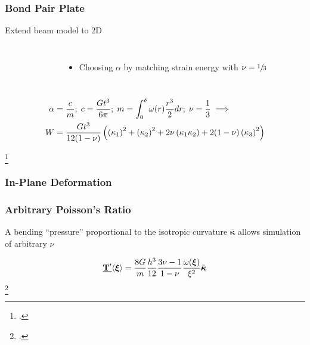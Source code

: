 \begin{frame}
  \frametitle{Bond Pair Plate}

    \begin{center}
        Extend beam model to 2D
    \end{center}

     \begin{columns}[T] %

        \vspace{-1.5cm}
        \begin{figure}
            \centering
        \end{figure}

       \vfill
       \begin{itemize}
           \item Choosing \(\alpha\) by matching strain energy with \(\nu = \sfrac{1}{3}\)
       \end{itemize}
     
     \end{columns}
%
%
\begin{align*}
\alpha &= \frac{c}{m} ;\; c= \frac{G t^3}{6 \pi} ;\; m=\int_{0}^\delta \omega(r)\frac{r^3}{2} dr ;\; \nu=\frac{1}{3} \implies \notag\\
W&=\frac{G t^3}{12(1-\nu)}\left(\left(\kappa_1\right)^2 +\left(\kappa_2\right)^2 +2\nu\left(\kappa_1\kappa_2\right) +2(1-\nu)\left(\kappa_3\right)^2 \right) 
\end{align*}

\footcite{jogrady2014b}
%
\end{frame}
%
%
\begin{frame}
  \frametitle{In-Plane Deformation}
  
  \vfill
  \begin{figure}
      \centering
  \end{figure}
%
\end{frame}
%
%
\begin{frame}

  \frametitle{Arbitrary Poisson's Ratio}

  
  \resizebox{\linewidth}{!}{}
  
  A bending ``pressure'' proportional to the isotropic curvature \(\bar{\boldsymbol{\kappa}}\) allows simulation of arbitrary $\nu$
  
\begin{equation}
     \vstate{T'}{}{\boldsymbol{\xi}}=\frac{8G}{m}\frac{h^3}{12}\frac{3\nu-1}{1-\nu}\frac{\omega(\boldsymbol{\xi})}{\xi^2} \bar{\boldsymbol{\kappa}} \notag
\end{equation}
%
\footcite{jogrady2014b}
\end{frame}
